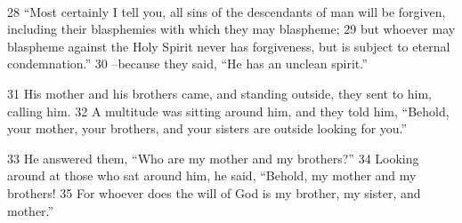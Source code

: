 \documentclass[10pt,a5paper,twoside,twocolumn]{book}
\newcommand*\cleartoleftpage{%
  \ifodd\value{page}\hbox{}\clearpage\fi
}
\newcommand{\separator}{
  \vspace{-0.5\baselineskip}%
  \hspace{0.27\textwidth}%
  \noindent\makebox[\linewidth]{\resizebox{0.3333\linewidth}{1pt}{$\bullet$}}\bigskip%
  \vspace{-0.5\baselineskip}
}
\newenvironment{facing}{\cleartoleftpage}{\clearpage\pagebreak}
\newenvironment{help}{\clearpage}{}
\newenvironment{helpsec}{\begin{minipage}[t]{\textwidth}\begin{multicols}{2}}{\end{multicols}\end{minipage}}
\newenvironment{translation}{\separator\\\begin{helpsec}\footnotesize}{\end{helpsec}}
\begin{document}
\begin{facing}
\begin{help}
\begin{translation}
28  ``Most certainly I tell you, all sins of the descendants of man will be forgiven, including their blasphemies with which they may blaspheme; 29  but whoever may blaspheme against the Holy Spirit never has forgiveness, but is subject to eternal condemnation.'' 30 --because they said, ``He has an unclean spirit.''

31 His mother and his brothers came, and standing outside, they sent to him, calling him. 32 A multitude was sitting around him, and they told him, ``Behold, your mother, your brothers, and your sisters are outside looking for you.''

33 He answered them, ``Who are my mother and my brothers?'' 34 Looking around at those who sat around him, he said, ``Behold, my mother and my brothers! 35  For whoever does the will of God is my brother, my sister, and mother.'' 

\end{translation}
\end{help}
\end{facing}
\end{document}
